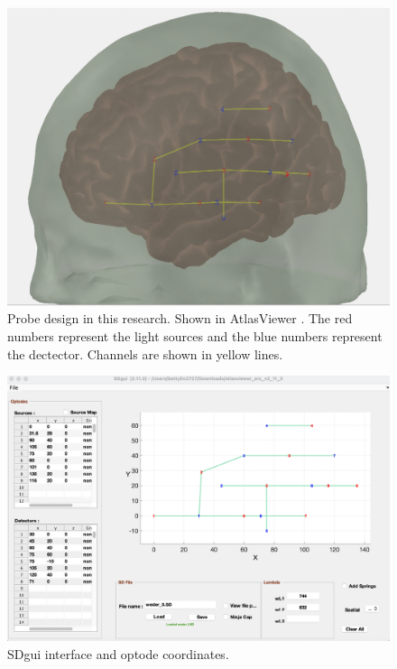 \begin{figure}[H]
  \centering
    \includegraphics[scale=.35]{bilder/atlas_probe.png}
  \caption{Probe design in this research. Shown in AtlasViewer  \citeyear {10.1117/1.NPh.2.2.020801} . The red numbers represent the light sources and the blue numbers represent the dectector. Channels are shown in yellow lines.}
  \label{fig:atlas}
\end{figure}

\begin{figure}[H]
  \centering
    \includegraphics[scale=.35]{bilder/SDgui.png}
  \caption{SDgui interface and optode coordinates.}
  \label{fig:sdgui}
\end{figure}

